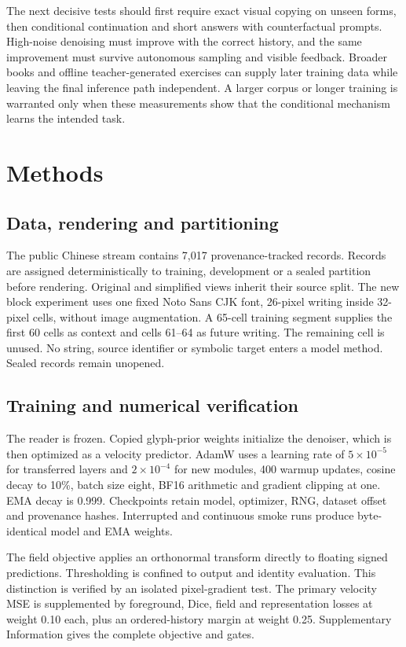 The next decisive tests should first require exact visual copying on unseen
forms, then conditional continuation and short answers with counterfactual
prompts. High-noise denoising must improve with the correct history, and the
same improvement must survive autonomous sampling and visible feedback.
Broader books and offline teacher-generated exercises can supply later
training data while leaving the final inference path independent. A larger
corpus or longer training is warranted only when these measurements show
that the conditional mechanism learns the intended task.

\section*{Methods}
\subsection*{Data, rendering and partitioning}
The public Chinese stream contains 7,017 provenance-tracked records. Records
are assigned deterministically to training, development or a sealed partition
before rendering. Original and simplified views inherit their source split.
The new block experiment uses one fixed Noto Sans CJK font, 26-pixel writing
inside 32-pixel cells, without image augmentation. A 65-cell training segment
supplies the first 60 cells as context and cells 61--64 as future writing.
The remaining cell is unused. No string, source identifier or symbolic target
enters a model method. Sealed records remain unopened.

\subsection*{Training and numerical verification}
The reader is frozen. Copied glyph-prior weights initialize the denoiser,
which is then optimized as a velocity predictor. AdamW uses a learning rate of
$5\times10^{-5}$ for transferred layers and $2\times10^{-4}$ for new modules,
400 warmup updates, cosine decay to 10\%, batch size eight, BF16 arithmetic and
gradient clipping at one. EMA decay is 0.999. Checkpoints retain model,
optimizer, RNG, dataset offset and provenance hashes. Interrupted and
continuous smoke runs produce byte-identical model and EMA weights.

The field objective applies an orthonormal transform directly to floating
signed predictions. Thresholding is confined to output and identity
evaluation. This distinction is verified by an isolated pixel-gradient test.
The primary velocity MSE is supplemented by foreground, Dice, field and
representation losses at weight 0.10 each, plus an ordered-history margin at
weight 0.25. Supplementary Information gives the complete objective and gates.


